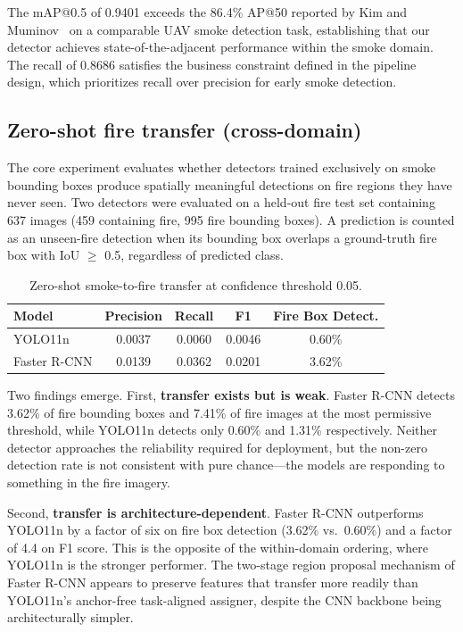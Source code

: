 \documentclass[10pt,twocolumn]{article}
\begin{document}
The mAP@0.5 of 0.9401 exceeds the 86.4\% AP@50 reported by Kim and Muminov~\cite{kim2023forest} on a comparable UAV smoke detection task, establishing that our detector achieves state-of-the-adjacent performance within the smoke domain. The recall of 0.8686 satisfies the business constraint defined in the pipeline design, which prioritizes recall over precision for early smoke detection.

\subsection{Zero-shot fire transfer (cross-domain)}

The core experiment evaluates whether detectors trained exclusively on smoke bounding boxes produce spatially meaningful detections on fire regions they have never seen. Two detectors were evaluated on a held-out fire test set containing 637 images (459 containing fire, 995 fire bounding boxes). A prediction is counted as an unseen-fire detection when its bounding box overlaps a ground-truth fire box with IoU $\geq$ 0.5, regardless of predicted class.

\begin{table}[H]
\centering
\caption{Zero-shot smoke-to-fire transfer at confidence threshold 0.05.}
\label{tab:zeroshot}
\begin{tabular}{@{}lcccc@{}}
\toprule
\textbf{Model} & \textbf{Precision} & \textbf{Recall} & \textbf{F1} & \textbf{Fire Box Detect.} \\
\midrule
YOLO11n & 0.0037 & 0.0060 & 0.0046 & 0.60\% \\
Faster R-CNN & 0.0139 & 0.0362 & 0.0201 & 3.62\% \\
\bottomrule
\end{tabular}
\end{table}

Two findings emerge. First, \textbf{transfer exists but is weak}. Faster R-CNN detects 3.62\% of fire bounding boxes and 7.41\% of fire images at the most permissive threshold, while YOLO11n detects only 0.60\% and 1.31\% respectively. Neither detector approaches the reliability required for deployment, but the non-zero detection rate is not consistent with pure chance---the models are responding to something in the fire imagery.

Second, \textbf{transfer is architecture-dependent}. Faster R-CNN outperforms YOLO11n by a factor of six on fire box detection (3.62\% vs.\ 0.60\%) and a factor of 4.4 on F1 score. This is the opposite of the within-domain ordering, where YOLO11n is the stronger performer. The two-stage region proposal mechanism of Faster R-CNN appears to preserve features that transfer more readily than YOLO11n's anchor-free task-aligned assigner, despite the CNN backbone being architecturally simpler.
\end{document}
